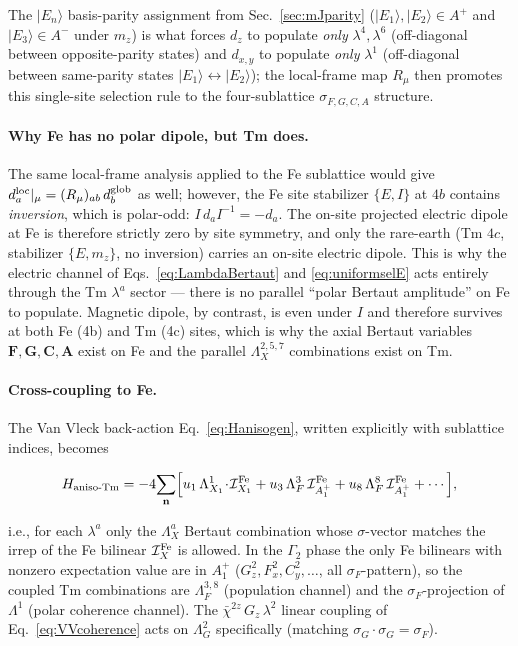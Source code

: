 \documentclass[reprint,amsmath,amssymb,aps,prb,longbibliography]{revtex4-2}
\newcommand{\bfF}{\mathbf{F}}
\newcommand{\bfG}{\mathbf{G}}
\newcommand{\bfA}{\mathbf{A}}
\newcommand{\bfC}{\mathbf{C}}
\begin{document}
The $|E_n\rangle$ basis-parity assignment from Sec.~\ref{sec:mJparity}
($|E_1\rangle,|E_2\rangle\in A^+$ and $|E_3\rangle\in A^-$ under
$m_z$) is what forces $d_z$ to populate \emph{only}
$\lambda^4,\lambda^6$ (off-diagonal between opposite-parity states)
and $d_{x,y}$ to populate \emph{only} $\lambda^1$ (off-diagonal
between same-parity states $|E_1\rangle\leftrightarrow|E_2\rangle$);
the local-frame map $R_\mu$ then promotes this single-site
selection rule to the four-sublattice $\sigma_{F,G,C,A}$ structure.

\paragraph{Why Fe has no polar dipole, but Tm does.} The same
local-frame analysis applied to the Fe sublattice would give
$d_a^{\rm loc}|_\mu = (R_\mu)_{ab}\,d_b^{\rm glob}$ as well; however,
the Fe site stabilizer $\{E,I\}$ at $4b$ contains \emph{inversion},
which is polar-odd: $I\,d_a I^{-1} = -d_a$. The on-site projected
electric dipole at Fe is therefore strictly zero by site symmetry,
and only the rare-earth (Tm $4c$, stabilizer $\{E,m_z\}$, no
inversion) carries an on-site electric dipole. This is why the
electric channel of Eqs.~\eqref{eq:LambdaBertaut} and \eqref{eq:uniformselE}
acts entirely through the Tm $\lambda^a$ sector --- there is no
parallel ``polar Bertaut amplitude'' on Fe to populate. Magnetic
dipole, by contrast, is even under $I$ and therefore survives at both
Fe (4b) and Tm (4c) sites, which is why the axial Bertaut variables
$\bfF,\bfG,\bfC,\bfA$ exist on Fe and the parallel $\Lambda^{2,5,7}_X$
combinations exist on Tm.

\paragraph{Cross-coupling to Fe.} The Van Vleck back-action
Eq.~\eqref{eq:Hanisogen}, written explicitly with sublattice indices,
becomes
\begin{widetext}
\begin{equation}
H_{\rm aniso\text{-}Tm} = -4\!\sum_{\mathbf n}\Bigl[
u_1\,\Lambda^1_{X_1}\!\cdot\!\mathcal I^{\rm Fe}_{X_1}
+ u_3\,\Lambda^3_F\,\mathcal I^{\rm Fe}_{A_1^+}
+ u_8\,\Lambda^8_F\,\mathcal I^{\rm Fe}_{A_1^+}
+ \cdots\Bigr],
\label{eq:HanisogenBertaut}
\end{equation}
\end{widetext}
i.e., for each $\lambda^a$ only the $\Lambda^a_X$ Bertaut combination
whose $\sigma$-vector matches the irrep of the Fe bilinear $\mathcal I^{\rm Fe}_{X}$
is allowed. In the $\Gamma_2$ phase the only Fe bilinears with nonzero
expectation value are in $A_1^+$ ($G_z^2, F_x^2, C_y^2,\ldots$, all
$\sigma_F$-pattern), so the coupled Tm combinations are
$\Lambda^{3,8}_F$ (population channel) and the $\sigma_F$-projection of
$\Lambda^1$ (polar coherence channel). The $\bar\chi^{2z}\,G_z\,\lambda^2$
linear coupling of Eq.~\eqref{eq:VVcoherence} acts on
$\Lambda^2_G$ specifically (matching $\sigma_G\!\cdot\!\sigma_G=\sigma_F$).
\end{document}
